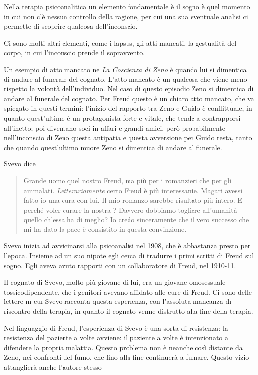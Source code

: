 \documentclass[a4paper, twoside, titlepage]{book}
\newcounter{mar}
\newcommand{\citazione}[1]{%
  \begin{quotation}
  \noindent #1
  \end{quotation}}
\begin{document}
Nella terapia psicoanalitica un elemento fondamentale è il sogno è quel momento in cui non c'è nessun controllo della ragione, per cui una sua eventuale analisi ci permette di scoprire qualcosa dell'inconscio.

Ci sono molti altri elementi, come i lapsus, gli atti mancati, la gestualità del corpo, in cui l'inconscio prende il sopravvento.

Un esempio di atto mancato ne \textit{La Coscienza di Zeno} è quando lui si dimentica di andare al funerale del cognato.
L'atto mancato è un qualcosa che viene meno rispetto la volontà dell'individuo. Nel caso di questo episodio Zeno si dimentica di andare al funerale del cognato. Per Freud questo è un chiaro atto mancato, che va spiegato in questi termini: l'inizio del rapporto tra Zeno e Guido è conflittuale, in quanto quest'ultimo è un protagonista forte e vitale, che tende a contrapporsi all'inetto; poi diventano soci in affari e grandi amici, però probabilmente nell'inconscio di Zeno questa antipatia e questa avversione per Guido resta, tanto che quando quest'ultimo muore Zeno si dimentica di andare al funerale.

Svevo dice
\citazione{Grande uomo quel nostro Freud, ma più per i romanzieri che per gli ammalati. \textit{Letterariamente} certo Freud è più interessante. Magari avessi fatto io una cura con lui. Il mio romanzo sarebbe risultato più intero. E perché voler curare la nostra ? Davvero dobbiamo togliere all'umanità quello ch'essa ha di meglio? Io credo sinceramente che il vero successo che mi ha dato la pace è consistito in questa convinzione.}

Svevo inizia ad avvicinarsi alla psicoanalisi nel 1908, che è abbastanza presto per l'epoca. Insieme ad un suo nipote egli cerca di tradurre i primi scritti di Freud sul sogno.
Egli aveva avuto rapporti con un collaboratore di Freud, nel 1910-11.

Il cognato di Svevo, molto più giovane di lui, era un giovane omosessuale tossicodipendente, che i genitori avevano affidato alle cure di Freud. Ci sono delle lettere in cui Svevo racconta questa esperienza, con l'assoluta mancanza di riscontro della terapia, in quanto il cognato venne distrutto alla fine della terapia.

Nel linguaggio di Freud, l'esperienza di Svevo è una sorta di resistenza: la resistenza del paziente a volte avviene: il paziente a volte è intenzionato a difendere la propria malattia.
Questo problema non è neanche così distante da Zeno, nei confronti del fumo, che fino alla fine continuerà a fumare.
Questo vizio attanglierà anche l'autore stesso
\end{document}
